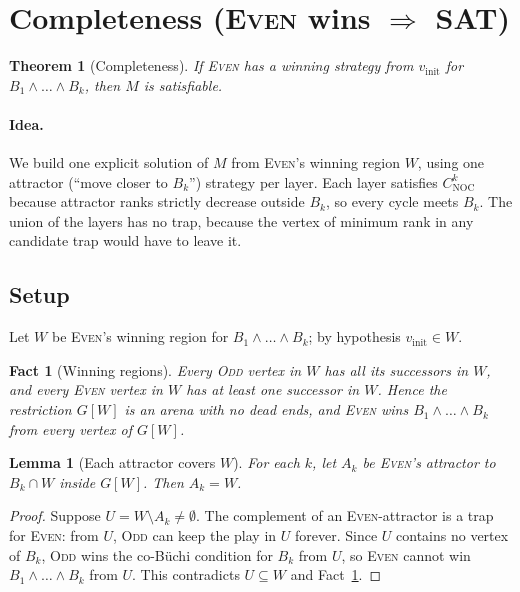 \documentclass{article}
\newtheorem{theorem}{Theorem}
\newtheorem{lemma}{Lemma}
\newtheorem{fact}{Fact}
\theoremstyle{definition}
\theoremstyle{remark}
\newcommand{\Even}{\textsc{Even}}
\newcommand{\Odd}{\textsc{Odd}}
\newcommand{\vinit}{v_{\mathrm{init}}}
\newcommand{\CNOC}{C_{\mathrm{NOC}}}
\begin{document}
\section*{Completeness (\Even{} wins $\Rightarrow$ SAT)}

\begin{theorem}[Completeness]\label{thm:completeness}
If \Even{} has a winning strategy from $\vinit$ for
$B_1 \wedge \dots \wedge B_k$, then $M$ is satisfiable.
\end{theorem}

\paragraph{Idea.} We build one explicit solution of $M$ from \Even{}'s winning
region $W$, using one attractor (``move closer to $B_k$'') strategy per layer.
Each layer satisfies $\CNOC^{k}$ because attractor ranks strictly decrease
outside $B_k$, so every cycle meets $B_k$. The union of the layers has no
trap, because the vertex of minimum rank in any candidate trap would have to
leave it.

\subsection*{Setup}

Let $W$ be \Even{}'s winning region for $B_1 \wedge \dots \wedge B_k$; by
hypothesis $\vinit \in W$.

\begin{fact}[Winning regions]\label{fact:W}
Every \Odd{} vertex in $W$ has all its successors in $W$, and every \Even{}
vertex in $W$ has at least one successor in $W$. Hence the restriction $G[W]$
is an arena with no dead ends, and \Even{} wins
$B_1 \wedge \dots \wedge B_k$ from every vertex of $G[W]$.
\end{fact}

\begin{lemma}[Each attractor covers $W$]\label{lem:attr}
For each $k$, let $A_k$ be \Even{}'s attractor to $B_k \cap W$ inside $G[W]$.
Then $A_k = W$.
\end{lemma}

\begin{proof}
Suppose $U = W \setminus A_k \neq \emptyset$. The complement of an
\Even{}-attractor is a trap for \Even{}: from $U$, \Odd{} can keep the play in
$U$ forever. Since $U$ contains no vertex of $B_k$, \Odd{} wins the co-B\"uchi
condition for $B_k$ from $U$, so \Even{} cannot win
$B_1 \wedge \dots \wedge B_k$ from $U$. This contradicts $U \subseteq W$ and
Fact~\ref{fact:W}.
\end{proof}
\end{document}
